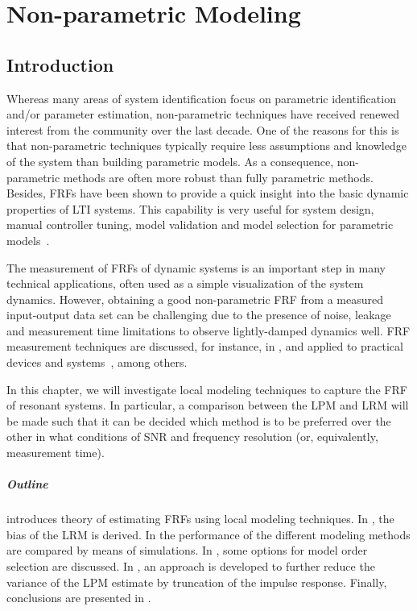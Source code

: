 \chapter{Non-parametric Modeling}
\def\thisDir{ch03-lrm}
\label{sec:nonparametric}

\section{Introduction}
\label{sec:nonparametric:introduction}

Whereas many areas of system identification focus on parametric identification and/or parameter estimation, non-parametric techniques have received renewed interest from the community over the last decade.
One of the reasons for this is that non-parametric techniques typically require less assumptions and knowledge of the system than building parametric models.
As a consequence, non-parametric methods are often more robust than fully parametric methods.
Besides, \glspl{FRF} have been shown to provide a quick insight into the basic dynamic properties of \gls{LTI} systems.
This capability is very useful for system design, manual controller tuning, model validation and model selection for parametric models~\citep{Pintelon2012}.

The measurement of \glspl{FRF} of dynamic systems is an important step in many technical applications, often used as a simple visualization of the system dynamics.
However, obtaining a good non-parametric \gls{FRF} from a measured input-output data set can be challenging due to the presence of noise, leakage and measurement time limitations to observe lightly-damped dynamics well.
\gls{FRF} measurement techniques are discussed, for instance, in
\citep{Schoukens1998,Schoukens2006LPM,Guillaume1996,Broersen1995,Pintelon2010LPM1,Antoni2007FRF,Pintelon2012}, and applied to practical devices and systems~\citep{Lim2010,Robinson1990,Behjat2010}, among others.

In this chapter, we will investigate local modeling techniques to capture the \gls{FRF} of resonant systems.
In particular, a comparison between the \gls{LPM} and \gls{LRM} will be made such that it can be decided which method is to be preferred over the other in what conditions of \gls{SNR} and frequency resolution (or, equivalently, measurement time).

\paragraph*{Outline}
 introduces theory of estimating \glspl{FRF} using local modeling techniques.
In , the bias of the \gls{LRM} is derived.
In  the performance of the different modeling methods are compared by means of simulations.
In , some options for model order selection are discussed.
In , an approach is developed to further reduce the variance of the \gls{LPM} estimate by truncation of the impulse response.
Finally, conclusions are presented in .

